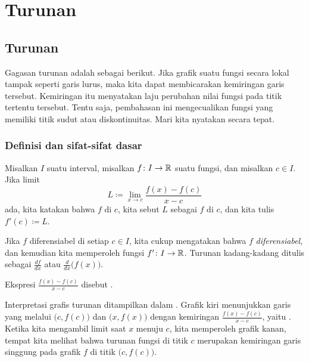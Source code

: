 \chapter{Turunan} \label{der:chapter}


\section{Turunan}
\label{sec:der}



Gagasan turunan adalah sebagai berikut.
Jika grafik suatu fungsi secara lokal tampak seperti garis lurus,
maka kita dapat membicarakan kemiringan garis tersebut.
Kemiringan itu menyatakan laju perubahan
nilai fungsi pada titik tertentu tersebut.
Tentu saja, pembahasan ini mengecualikan fungsi yang memiliki titik sudut atau
diskontinuitas.
Mari kita nyatakan secara tepat.

\subsection{Definisi dan sifat-sifat dasar}

\begin{defn}
Misalkan $I$ suatu interval, misalkan
$f \colon I \to {\mathbb{R}}$ suatu fungsi, dan misalkan $c \in I$.  Jika
limit
\begin{equation*}
L \coloneqq \lim_{x \to c} \frac{f(x)-f(c)}{x-c} 
\end{equation*}
ada, kita katakan bahwa $f$
\emph{} di
$c$, kita sebut $L$ sebagai \emph{} $f$ di $c$,
dan kita tulis $f'(c) \coloneqq L$.

\medskip

Jika $f$ diferensiabel di setiap $c \in I$, kita cukup mengatakan bahwa
$f$ \emph{diferensiabel}, dan kemudian kita memperoleh fungsi
$f' \colon I \to {\mathbb{R}}$.
Turunan kadang-kadang ditulis sebagai $\frac{df}{dx}$ atau
$\frac{d}{dx}\bigl( f(x) \bigr)$.

\medskip

Ekspresi $\frac{f(x)-f(c)}{x-c}$ disebut
\emph{}.
\end{defn}

Interpretasi grafis turunan ditampilkan dalam
.  Grafik kiri menunjukkan garis yang melalui
$\bigl(c,f(c)\bigr)$
dan $\bigl(x,f(x)\bigr)$ dengan kemiringan
$\frac{f(x)-f(c)}{x-c}$, yaitu
\emph{}.  Ketika kita mengambil limit saat $x$ menuju $c$,
kita memperoleh grafik kanan, tempat kita melihat
bahwa turunan fungsi
di titik $c$ merupakan kemiringan garis singgung pada grafik $f$
di titik $\bigl(c,f(c)\bigr)$.


